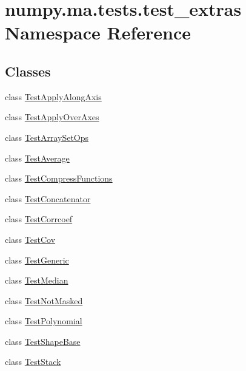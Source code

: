 \hypertarget{namespacenumpy_1_1ma_1_1tests_1_1test__extras}{}\section{numpy.\+ma.\+tests.\+test\+\_\+extras Namespace Reference}
\label{namespacenumpy_1_1ma_1_1tests_1_1test__extras}
\subsection*{Classes}
\begin{DoxyCompactItemize}
\item 
class \hyperlink{classnumpy_1_1ma_1_1tests_1_1test__extras_1_1TestApplyAlongAxis}{Test\+Apply\+Along\+Axis}
\item 
class \hyperlink{classnumpy_1_1ma_1_1tests_1_1test__extras_1_1TestApplyOverAxes}{Test\+Apply\+Over\+Axes}
\item 
class \hyperlink{classnumpy_1_1ma_1_1tests_1_1test__extras_1_1TestArraySetOps}{Test\+Array\+Set\+Ops}
\item 
class \hyperlink{classnumpy_1_1ma_1_1tests_1_1test__extras_1_1TestAverage}{Test\+Average}
\item 
class \hyperlink{classnumpy_1_1ma_1_1tests_1_1test__extras_1_1TestCompressFunctions}{Test\+Compress\+Functions}
\item 
class \hyperlink{classnumpy_1_1ma_1_1tests_1_1test__extras_1_1TestConcatenator}{Test\+Concatenator}
\item 
class \hyperlink{classnumpy_1_1ma_1_1tests_1_1test__extras_1_1TestCorrcoef}{Test\+Corrcoef}
\item 
class \hyperlink{classnumpy_1_1ma_1_1tests_1_1test__extras_1_1TestCov}{Test\+Cov}
\item 
class \hyperlink{classnumpy_1_1ma_1_1tests_1_1test__extras_1_1TestGeneric}{Test\+Generic}
\item 
class \hyperlink{classnumpy_1_1ma_1_1tests_1_1test__extras_1_1TestMedian}{Test\+Median}
\item 
class \hyperlink{classnumpy_1_1ma_1_1tests_1_1test__extras_1_1TestNotMasked}{Test\+Not\+Masked}
\item 
class \hyperlink{classnumpy_1_1ma_1_1tests_1_1test__extras_1_1TestPolynomial}{Test\+Polynomial}
\item 
class \hyperlink{classnumpy_1_1ma_1_1tests_1_1test__extras_1_1TestShapeBase}{Test\+Shape\+Base}
\item 
class \hyperlink{classnumpy_1_1ma_1_1tests_1_1test__extras_1_1TestStack}{Test\+Stack}
\end{DoxyCompactItemize}
